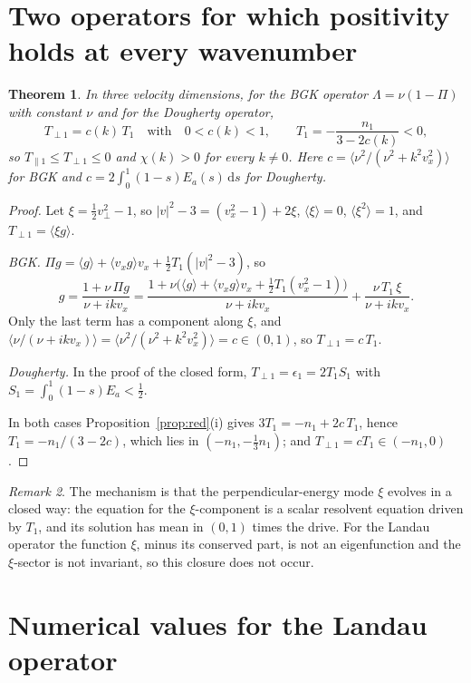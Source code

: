 \documentclass[11pt]{article}
\newcommand{\dd}{\mathrm{d}}
\newcommand{\avg}[1]{\langle #1\rangle}
\newcommand{\Tpar}{T_{\parallel1}}
\newcommand{\Tperp}{T_{\perp1}}
\newtheorem{theorem}{Theorem}
\theoremstyle{remark}
\newtheorem{remark}[theorem]{Remark}
\begin{document}
\section{Two operators for which positivity holds at every wavenumber}

\begin{theorem}\label{thm:models}
In three velocity dimensions, for the BGK operator
$\Lambda=\nu(1-\Pi)$ with constant $\nu$ and for the Dougherty operator,
\[
  \Tperp=c(k)\,T_1\quad\text{with}\quad0<c(k)<1,\qquad
  T_1=-\frac{n_1}{3-2c(k)}<0 ,
\]
so $\Tpar\le\Tperp\le0$ and $\chi(k)>0$ for every $k\ne0$. Here
$c=\avg{\nu^2/(\nu^2+k^2v_x^2)}$ for BGK and
$c=2\int_0^1(1-s)E_a(s)\,\dd s$ for Dougherty.
\end{theorem}

\begin{proof}
Let $\xi=\tfrac12v_\perp^2-1$, so $|v|^2-3=(v_x^2-1)+2\xi$, $\avg{\xi}=0$,
$\avg{\xi^2}=1$, and $\Tperp=\avg{\xi g}$.

\emph{BGK.} $\Pi g=\avg{g}+\avg{v_xg}v_x+\tfrac12T_1(|v|^2-3)$, so
\[
  g=\frac{1+\nu\,\Pi g}{\nu+ikv_x}
   =\frac{1+\nu\bigl(\avg{g}+\avg{v_xg}v_x+\tfrac12T_1(v_x^2-1)\bigr)}{\nu+ikv_x}
    +\frac{\nu\,T_1\,\xi}{\nu+ikv_x}.
\]
Only the last term has a component along $\xi$, and
$\avg{\nu/(\nu+ikv_x)}=\avg{\nu^2/(\nu^2+k^2v_x^2)}=c\in(0,1)$, so
$\Tperp=c\,T_1$.

\emph{Dougherty.} In the proof of the closed form, $\Tperp=\epsilon_1
=2T_1S_1$ with $S_1=\int_0^1(1-s)E_a<\tfrac12$.

In both cases Proposition~\ref{prop:red}(i) gives
$3T_1=-n_1+2c\,T_1$, hence $T_1=-n_1/(3-2c)$, which lies in
$(-n_1,-\tfrac13n_1)$; and $\Tperp=cT_1\in(-n_1,0)$.
\end{proof}

\begin{remark}
The mechanism is that the perpendicular-energy mode $\xi$ evolves in a closed
way: the equation for the $\xi$-component is a scalar resolvent equation
driven by $T_1$, and its solution has mean in $(0,1)$ times the drive. For
the Landau operator the function $\xi$, minus its conserved part, is not an
eigenfunction and the $\xi$-sector is not invariant, so this closure does not
occur.
\end{remark}

\section{Numerical values for the Landau operator}
\label{sec:num}
\end{document}
